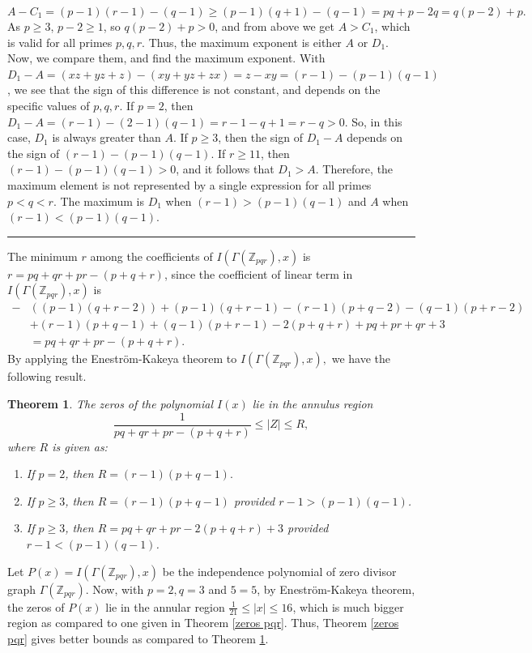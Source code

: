 \documentclass[12pt,twoside]{article}
\newtheorem{theorem}{Theorem}[section]
\renewenvironment{proof}{{\noindent\bfseries Proof.}}{\qed}
\def\qed{\nolinebreak\hfill\rule{.2cm}{.2cm}\par\addvspace{.5cm}}
\begin{document}
\begin{proof}
	$$A-C_1 = (p-1)(r-1)-(q-1) \ge (p-1)(q+1)-(q-1) =  pq+p-2q = q(p-2)+p.$$
	As $p \ge 3$, $p-2 \ge 1$, so $q(p-2)+p > 0$, and from above we get $A > C_1$, which is valid for all primes $p,q,r$. Thus, the maximum exponent is either $A$ or $D_1$. Now, we compare them, and find the maximum exponent.  With $D_1 - A = (xz+yz+z) - (xy+yz+zx) = z-xy = (r-1)-(p-1)(q-1)$, we see that  the sign of this difference is not constant, and depends on the specific values of $p,q,r$. If $p=2$, then $D_1 - A = (r-1) - (2-1)(q-1) = r-1-q+1 = r-q > 0$. So, in this case, $D_1$ is always greater than $A$.  If $p \ge 3$, then the sign of $D_1-A$ depends on the sign of $(r-1)-(p-1)(q-1)$. If $r\geq 11$, then  $(r-1)-(p-1)(q-1)> 0$, and it follows that $D_1 > A$. Therefore, the maximum element is not represented by a single expression for all primes $p<q<r$. The maximum is $D_1$ when $(r-1) > (p-1)(q-1)$ and $A$ when $(r-1) < (p-1)(q-1)$.
\end{proof}
The minimum $r$ among the coefficients of $I(\varGamma(\mathbb{Z}_{pqr}),x)$ is $r=p q + q r + p r - (p + q + r)$, since the coefficient of linear term in $ I(\varGamma(\mathbb{Z}_{pqr}),x)$ is 
\begin{align*}
	-&((p-1) (q+r-2))+(p-1) (q+r-1)-(r-1) (p+q-2)-(q-1) (p+r-2)\\
	&+(r-1) (p+q-1)+(q-1) (p+r-1)-2 (p+q+r)+p q+p r+q r+3\\
	&= p q + q r + p r - (p + q + r).
\end{align*}
By applying the Eneström-Kakeya theorem to $I(\varGamma(\mathbb{Z}_{pqr}),x), $ we have the following result.
\begin{theorem}\rm\label{kakeya}
	The zeros of the polynomial $I(x)$ lie in the annulus region 
	$$\frac{1}{p q + q r + p r - (p + q + r)} \leq |Z| \leq R,$$ where $R$ is given as:
	\begin{enumerate}
		\item If $p=2$, then $R=(r-1)(p+q-1).$
		\item If $p \ge 3$, then $R=(r-1)(p+q-1)$ provided $r-1 > (p-1)(q-1)$.
		\item  If $p \ge 3$, then $R= pq+qr+pr-2(p+q+r)+3$ provided $r-1 < (p-1)(q-1)$.
	\end{enumerate}
\end{theorem}
Let $P(x)=I(\varGamma(\mathbb{Z}_{pqr}),x)$ be the independence polynomial of zero divisor graph $\varGamma(\mathbb{Z}_{pqr}).$ Now, with $p=2,q=3$ and $5=5$, by Eneström-Kakeya theorem, the zeros of $P(x) $ lie in the annular region $\tfrac{1}{21}\leq |x|\leq 16$, which is much bigger region as compared to one given in Theorem \ref{zeros pqr}. Thus, Theorem \ref{zeros pqr} gives better bounds as compared to Theorem \ref{kakeya}. \vskip 2mm
\end{document}
